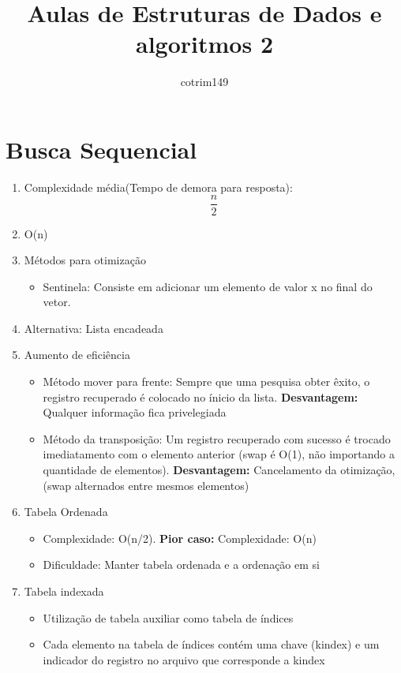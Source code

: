 \documentclass{article}
\title{Aulas de Estruturas de Dados e algoritmos 2}
\author{cotrim149}
\begin{document}
\maketitle

\section{Busca Sequencial}
	\begin{enumerate}
	\item Complexidade média(Tempo de demora para resposta): 
		\begin{equation}
		\frac{n}{2}			
		\end{equation}
	\item O(n)
	\item Métodos para otimização
		\begin{itemize}
		\item Sentinela: Consiste em adicionar um elemento de valor x no final do vetor.
		\end{itemize}		 
	\item Alternativa: Lista encadeada
	\item Aumento de eficiência
		\begin{itemize}
		\item Método mover para frente: Sempre que uma pesquisa obter êxito, o registro recuperado é colocado no ínicio da lista. \textbf{Desvantagem:} Qualquer informação fica privelegiada
		\item Método da transposição: Um registro recuperado com sucesso é trocado imediatamento com o elemento anterior (swap é O(1), não importando a quantidade de elementos). \textbf{Desvantagem:} Cancelamento da otimização, (swap alternados entre mesmos elementos)		
		\end{itemize}
	\item Tabela Ordenada
		\begin{itemize}
		\item Complexidade: O(n/2). \textbf{Pior caso:} Complexidade: O(n)
		\item Dificuldade: Manter tabela ordenada e a ordenação em si
		\end{itemize}
	\item Tabela indexada
		\begin{itemize}
		\item Utilização de tabela auxiliar como tabela de índices
		\item Cada elemento na tabela de índices contém uma chave (kindex) e um indicador do registro no arquivo que corresponde a kindex

\end{itemize}
\end{enumerate}
\end{document}
